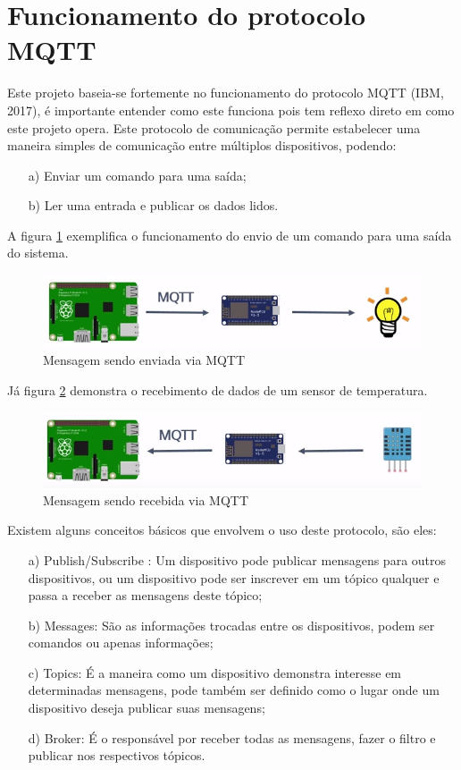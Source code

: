 \section{Funcionamento do protocolo MQTT}
Este projeto baseia-se fortemente no funcionamento do protocolo MQTT (IBM, 2017), é importante entender como este funciona pois tem reflexo direto em como este projeto opera. Este protocolo de comunicação permite estabelecer uma maneira simples de comunicação entre múltiplos dispositivos, podendo:

\begin{itemize}
    \item[a)] Enviar um comando para uma saída;
    \item[b)] Ler uma entrada e publicar os dados lidos.
\end{itemize}

A figura \ref{mqtt-1} exemplifica o funcionamento do envio de um comando para uma saída do sistema.

\begin{figure}[H]
\caption{\label{mqtt-1} Mensagem sendo enviada via MQTT}
\includegraphics[scale=0.5]{img/mqtt-1.png}
\end{figure}

Já figura \ref{mqtt-2} demonstra o recebimento de dados de um sensor de temperatura.

\begin{figure}[H]
\caption{\label{mqtt-2} Mensagem sendo recebida via MQTT}
\includegraphics[scale=0.5]{img/mqtt-2.png}
\end{figure}

Existem alguns conceitos básicos que envolvem o uso deste protocolo, são eles:

\begin{itemize}
    \item[a)] Publish/Subscribe : Um dispositivo pode publicar mensagens para outros dispositivos, ou um dispositivo pode ser inscrever em um tópico qualquer e passa a receber as mensagens deste tópico;
    \item[b)] Messages: São as informações trocadas entre os dispositivos, podem ser comandos ou apenas informações;
    \item[c)] Topics: É a maneira como um dispositivo demonstra interesse em determinadas mensagens, pode também ser definido como o lugar onde um dispositivo deseja publicar suas mensagens;
    \item[d)] Broker: É o responsável por receber todas as mensagens, fazer o filtro e publicar nos respectivos tópicos.
\end{itemize}

